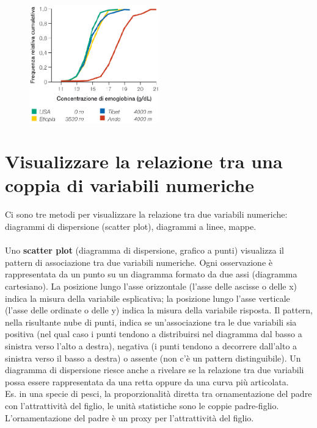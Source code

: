 \documentclass[10pt, draft]{book}
\begin{document}
\begin{figure}[h!]
    \centering
    \includegraphics[width=0.5\textwidth]{fig2.4-2}
    \caption{\small{}}
    \label{fig2.4-2}
\end{figure}

\section{Visualizzare la relazione tra una coppia di variabili numeriche}
Ci sono tre metodi per visualizzare la relazione tra due variabili numeriche: diagrammi di dispersione (scatter plot), diagrammi a linee, mappe.
\\
\\
Uno \textbf{scatter plot} (diagramma di dispersione, grafico a punti) visualizza il pattern di associazione tra due variabili numeriche. Ogni osservazione è rappresentata da un punto su un diagramma formato da due assi (diagramma cartesiano). La posizione lungo l'asse orizzontale (l'asse delle ascisse o delle x) indica la misura della variabile esplicativa; la posizione lungo l'asse verticale (l'asse delle ordinate o delle y) indica la misura della variabile risposta. Il pattern, nella risultante nube di punti, indica se un'associazione tra le due variabili sia positiva (nel qual caso i punti tendono a distribuirsi nel diagramma dal basso a sinistra verso l'alto a destra), negativa (i punti tendono a decorrere dall'alto a sinistra verso il basso a destra) o assente (non c'è un pattern distinguibile). Un diagramma di dispersione riesce anche a rivelare se la relazione tra due variabili possa essere rappresentata da una retta oppure da una curva più articolata.
\\
Es. in una specie di pesci, la proporzionalità diretta tra ornamentazione del padre con l'attrattività del figlio, le unità statistiche sono le coppie padre-figlio. L'ornamentazione del padre è un proxy per l'attrattività del figlio.\\
\end{document}
